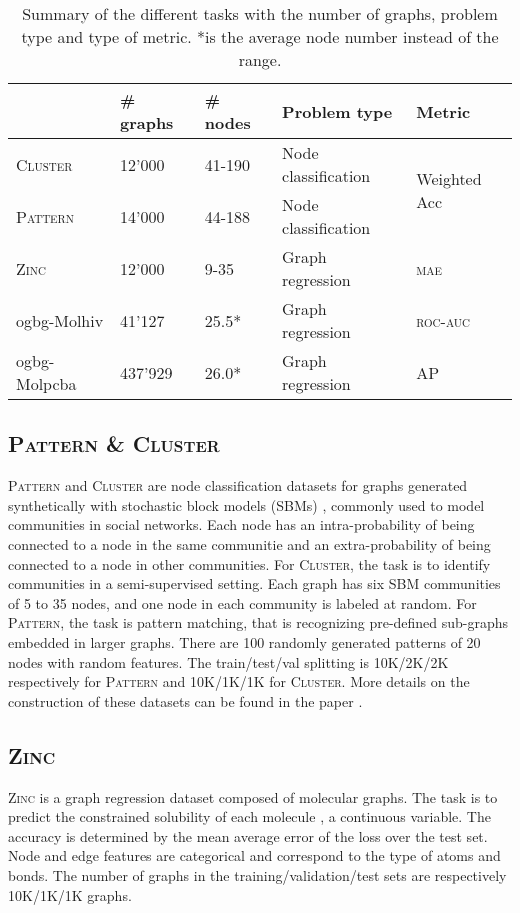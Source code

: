 \documentclass[letterpaper]{article} \usepackage{aaai21}  \usepackage{times}  \usepackage{helvet} \usepackage{courier}  \usepackage[hyphens]{url}  \usepackage{graphicx} \usepackage{natbib}  \usepackage{caption} \frenchspacing  \setlength{\pdfpagewidth}{8.5in}  \setlength{\pdfpageheight}{11in}
\begin{document}
\begin{table*}[htb]
\centering
\begin{tabular}{@{}lllll@{}}
\toprule
         & \# graphs &  \# nodes  & Problem type    & Metric \\ \midrule
\textsc{Cluster}  &  12'000   & 41-190     & Node classification &  \multirow{2}{*}{Weighted Acc}      \\
\textsc{Pattern}  &  14'000   & 44-188     & Node classification &      \\
\textsc{Zinc}     & 12'000    & 9-35       & Graph regression    &  \textsc{mae}      \\
ogbg-Molhiv           &   41'127  & 25.5*      & Graph regression    & \textsc{roc-auc} \\
ogbg-Molpcba          & 437'929   & 26.0*      & Graph regression    & \textsc{AP}\\ \bottomrule
\end{tabular}
\caption{Summary of the different tasks with the number of graphs, problem type and type of metric. *is the average node number instead of the range.}
\label{tab:experimentsSummary}
\end{table*}


\subsection{\textsc{Pattern \& Cluster}}

\textsc{Pattern} and \textsc{Cluster} are node classification datasets for graphs generated synthetically with stochastic block models (SBMs) \cite{abbe_community_2017}, commonly used to model communities in social networks.
Each node has an intra-probability of being connected to a node in the same communitie and an extra-probability of being connected to a node in other communities.
For \textsc{Cluster}, the task is to identify communities in a semi-supervised setting. Each graph has six SBM communities of 5 to 35 nodes, and one node in each community is labeled at random.
For \textsc{Pattern}, the task is pattern matching, that is recognizing pre-defined sub-graphs embedded in larger graphs. There are 100 randomly generated patterns of 20 nodes with random features.
The train/test/val splitting is 10K/2K/2K respectively for \textsc{Pattern} and 10K/1K/1K for \textsc{Cluster}.
More details on the construction of these datasets can be found in the paper \cite{dwivedi_benchmarking_2020}.



\subsection{\textsc{Zinc}}
\textsc{Zinc} is a graph regression dataset composed of molecular graphs. The task is to predict the constrained solubility of each molecule \cite{jin2018junction}, a continuous variable. The accuracy is determined by the mean average error of the  loss over the test set.
Node and edge features are categorical and correspond to the type of atoms and bonds.
The number of graphs in the training/validation/test sets are respectively 10K/1K/1K graphs.
\end{document}
